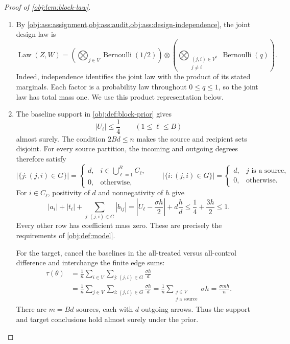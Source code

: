 \documentclass[11pt]{article}
\begin{document}
\begin{proof}[Proof of \cref{obj:lem:block-law}]
\begin{enumerate}
\item By \cref{obj:ass:assignment,obj:ass:audit,obj:ass:design-independence}, the joint design law is
\[
\operatorname{Law}(Z,W)
=
\left(\bigotimes_{j\in V}\operatorname{Bernoulli}(1/2)\right)
\otimes
\left(\bigotimes_{\substack{(j,i)\in V^2\\j\ne i}}
\operatorname{Bernoulli}(q)\right).
\]
Indeed, independence identifies the joint law with the product of its stated marginals. Each factor is a probability law throughout \(0\le q\le1\), so the joint law has total mass one. We use this product representation below. %

\item The baseline support in \cref{obj:def:block-prior} gives
\[
|U_\ell|\le\frac14
\qquad(1\le\ell\le B)
\]
almost surely. The condition \(2Bd\le n\) makes the source and recipient sets disjoint. For every source partition, the incoming and outgoing degrees therefore satisfy
\[
|\{j:(j,i)\in G\}|
=
\begin{cases}
d,&i\in\bigcup_{\ell=1}^{B}C_\ell,\\
0,&\text{otherwise},
\end{cases}
\qquad
|\{i:(j,i)\in G\}|
=
\begin{cases}
d,&j\text{ is a source},\\
0,&\text{otherwise}.
\end{cases}
\]
For \(i\in C_\ell\), positivity of \(d\) and nonnegativity of \(h\) give
\[
|a_i|+|t_i|+\sum_{j:(j,i)\in G}|b_{ij}|
=
\left|U_\ell-\frac{\sigma h}{2}\right|
+d\frac{h}{d}
\le\frac14+\frac{3h}{2}
\le1.
\]
Every other row has coefficient mass zero. These are precisely the requirements of \cref{obj:def:model}.

For the target, cancel the baselines in the all-treated versus all-control difference and interchange the finite edge sums:
\[
\begin{aligned}
\tau(\theta)
&=\frac1n\sum_{i\in V}\sum_{j:(j,i)\in G}\frac{\sigma h}{d}\\
&=\frac1n\sum_{j\in V}\sum_{i:(j,i)\in G}\frac{\sigma h}{d}
=\frac1n\sum_{\substack{j\in V\\j\text{ a source}}}\sigma h
=\frac{\sigma mh}{n}.
\end{aligned}
\]
There are \(m=Bd\) sources, each with \(d\) outgoing arrows. Thus the support and target conclusions hold almost surely under the prior. %


\end{enumerate}
\end{proof}
\end{document}

